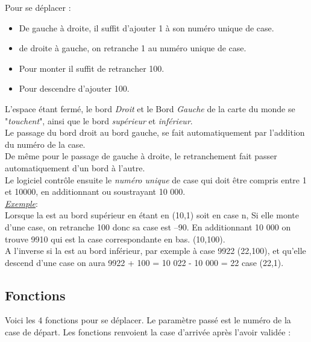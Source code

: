 \documentclass[french]{report}
\newlength{\du}\fi
\begin{document}
Pour se déplacer :
\begin{itemize}
	\item De gauche à droite, il suffit d'ajouter 1 à son numéro unique de case.
	\item de droite à gauche, on retranche 1 au numéro unique de case.
	\item Pour monter il suffit de retrancher 100.
	\item Pour descendre d'ajouter 100.\\
\end{itemize}

L'espace étant fermé, le bord \textit{Droit} et le Bord \textit{Gauche} de la carte du monde se "\textit{touchent}", ainsi que le bord \textit{supérieur} et \textit{inférieur}.\\
Le passage du bord droit au bord gauche, se fait automatiquement par l'addition du numéro de la case.\\
De même pour le passage de gauche à droite, le retranchement  fait passer automatiquement d'un bord à l'autre.\\

Le logiciel contrôle ensuite le \textit{numéro unique} de case qui doit être compris entre 1 et 10000, en additionnant ou soustrayant 10 000. \\

\textit{\underline{Exemple}}:\\
Lorsque la \CoCiX est au bord supérieur en étant  en (10,1) soit en case n,  Si elle monte d'une case, on retranche 100 donc sa case est  --90. En additionnant 10 000 on trouve 9910 qui est la case correspondante en bas. (10,100).\\
A l'inverse si la \CoCiX est au bord inférieur, par exemple à case 9922 (22,100), et qu'elle descend d'une case on aura 9922 + 100 = 10 022 - 10 000 = 22 case (22,1).

\subsection{Fonctions}
Voici les 4 fonctions pour se déplacer. Le paramètre passé est le numéro de la case de départ. Les fonctions renvoient la case d'arrivée après l'avoir validée : \\
\end{document}
